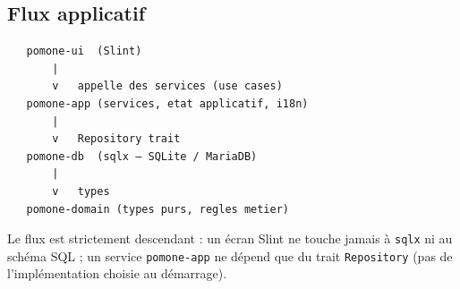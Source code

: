 \subsection{Flux applicatif}

\begin{lstlisting}
   pomone-ui  (Slint)
       |
       v   appelle des services (use cases)
   pomone-app (services, etat applicatif, i18n)
       |
       v   Repository trait
   pomone-db  (sqlx — SQLite / MariaDB)
       |
       v   types
   pomone-domain (types purs, regles metier)
\end{lstlisting}

Le flux est strictement descendant : un écran Slint ne touche jamais à \texttt{sqlx} ni au schéma SQL ; un service \texttt{pomone-app} ne dépend que du trait \texttt{Repository} (pas de l'implémentation choisie au démarrage).
